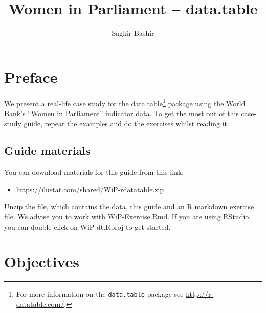 \documentclass[a4paper,9pt,twocolumn,twoside,printwatermark=true]{pinp}
\title{Women in Parliament -- data.table}
\author[]{Saghir Bashir}
\providecommand{\tightlist}{%
  \setlength{\itemsep}{0pt}\setlength{\parskip}{0pt}}
\begin{document}
\verticaladjustment{-2pt}

\maketitle
\thispagestyle{firststyle}



\section{Preface}\label{preface}

We present a real-life case study for the data.table\footnote{For more
  information on the \texttt{data.table} package see
  \url{http://r-datatable.com/}.} package using the World Bank's ``Women
in Parliament'' indicator data. To get the most out of this case-study
guide, repeat the examples and do the exercises whilst reading it.

\subsection{Guide materials}\label{guide-materials}

You can download materials for this guide from this link:

\begin{itemize}
\tightlist
\item
  \url{https://ilustat.com/shared/WiP-rdatatable.zip}
\end{itemize}

Unzip the file, which contains the data, this guide and an R markdown
exercise file. We advise you to work with WiP-Exercise.Rmd. If you are
using RStudio, you can double click on WiP-dt.Rproj to get started.

\section{Objectives}\label{objectives}
\end{document}
